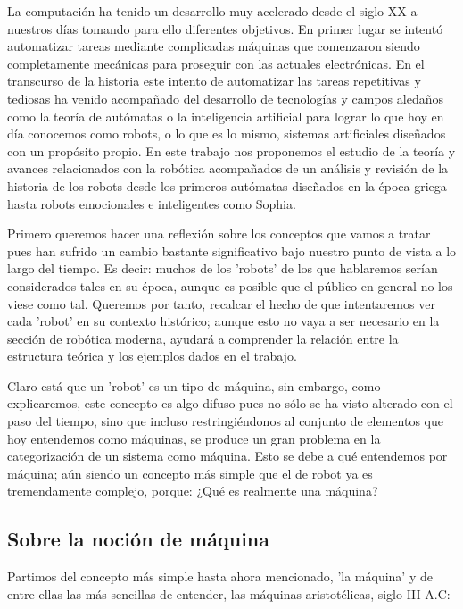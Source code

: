 
La computación ha tenido un desarrollo muy acelerado desde el siglo XX a nuestros días tomando para ello diferentes objetivos. En primer lugar se intentó automatizar tareas mediante complicadas máquinas que comenzaron siendo completamente mecánicas para proseguir con las actuales electrónicas. En el transcurso de la historia este intento de automatizar las tareas repetitivas y tediosas ha venido acompañado del desarrollo de tecnologías y campos aledaños como la teoría de autómatas o la inteligencia artificial para lograr lo que hoy en día conocemos como robots, o lo que es lo mismo, sistemas artificiales diseñados con un propósito propio. En este trabajo nos proponemos el estudio de la teoría y avances relacionados con la robótica acompañados de un análisis y revisión de la historia de los robots desde los primeros autómatas diseñados en la época griega hasta robots emocionales e inteligentes como Sophia.

\vspace{10px}


Primero queremos hacer una reflexión sobre los conceptos que vamos a tratar pues han sufrido un cambio bastante significativo bajo nuestro punto de vista a lo largo del tiempo. Es decir: muchos de los 'robots' de los que hablaremos serían considerados tales en su época, aunque es posible que el público en general no los viese como tal. Queremos por tanto, recalcar el hecho de que intentaremos ver cada 'robot' en su contexto histórico; aunque esto no vaya a ser necesario en la sección de robótica moderna, ayudará a comprender la relación entre la estructura teórica y los ejemplos dados en el trabajo.

\vspace{10px}

Claro está que un 'robot' es un tipo de máquina, sin embargo, como explicaremos, este concepto es algo difuso pues no sólo se ha visto alterado con el paso del tiempo, sino que incluso restringiéndonos  al conjunto de elementos que hoy entendemos como máquinas, se produce un gran problema en la categorización de un sistema como máquina. Esto se debe a qué entendemos por máquina; aún siendo un concepto más simple que el de robot ya es tremendamente complejo, porque: ¿Qué es realmente una máquina?

\subsection{Sobre la noción de máquina}


Partimos del concepto más simple hasta ahora mencionado, 'la máquina' y de entre ellas las más sencillas de entender, las máquinas aristotélicas, siglo III A.C: \\

